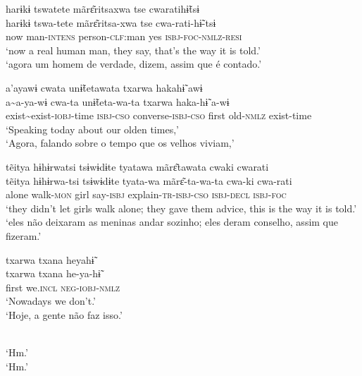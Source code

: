 \documentclass[output=paper,
modfonts,nonflat
]{langsci/langscibook}
\begin{document}
\ea harɨkɨ tswatete mãrɛ͂ritsaxwa tse cwaratihɨ̃tsɨ\\[.3em]
\gll harɨkɨ	tswa-tete		mãrɛ͂ritsa-xwa	tse		cwa-rati-hɨ̃-tsɨ{\footnotemark}\\
now	man-\textsc{intens}	person-\textsc{clf}:man	yes		\textsc{isbj-foc-nmlz-resi}\\
\glt ‘now a real human man, they say, that’s the way it is told.’\\
‘agora um homem de verdade, dizem, assim que é contado.'
\z

\ea a'ayawɨ cwata unɨ̃tetawata txarwa hakahɨ̃ awɨ\\[.3em]
\gll a\textasciitilde a-ya-wɨ				cwa-ta		unɨ̃teta-wa-ta		txarwa		haka-hɨ̃	a-wɨ\\
exist\textasciitilde exist-\textsc{iobj}-time	\textsc{isbj-cso}		converse-\textsc{isbj-cso}	first		old-\textsc{nmlz}	exist-time\\
\glt ‘Speaking today about our olden times,’\\
‘Agora, falando sobre o tempo que os velhos viviam,'
\z

\ea tẽitya hɨhɨrwatsi tsɨwɨdɨte tyatawa mãrɛ͂tawata cwaki cwarati\\[.3em]
\gll tẽitya	hɨhɨrwa-tsi	tsɨwɨdɨte	tyata-wa	mãrɛ͂-ta-wa-ta		cwa-ki		cwa-rati\\
alone	walk-\textsc{mon}		girl			say-\textsc{isbj}		explain-\textsc{tr-isbj-cso}	\textsc{isbj-decl}		\textsc{isbj-foc}\\
\glt ‘they didn’t let girls walk alone; they gave them advice, this is the way it is told.’\\
‘eles não deixaram as meninas andar sozinho; eles deram conselho, assim que fizeram.'
\z

\ea txarwa txana heyahɨ̃\\[.3em]
\gll txarwa		txana		he-ya-hɨ̃\\
first		we.\textsc{incl}	\textsc{neg-iobj-nmlz}\\
\glt ‘Nowadays we don’t.’{\footnotemark}\\
‘Hoje, a gente não faz isso.'
\z

\\[.3em]
 ‘Hm.'\\
 ‘Hm.'
\z
\end{document}
